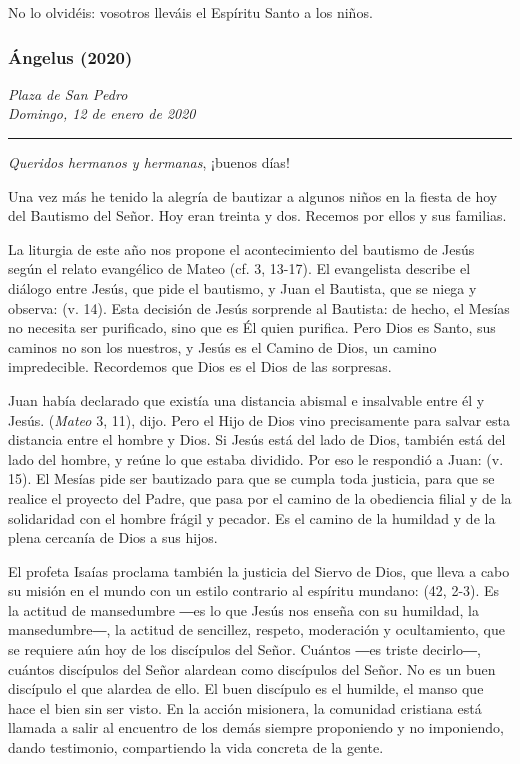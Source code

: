 {No lo olvidéis: vosotros lleváis el Espíritu Santo a los niños.



\subsubsection{Ángelus (2020)} \emph{Plaza de San Pedro\\ Domingo, 12 de enero de 2020}

\begin{center}\rule{0.5\linewidth}{\linethickness}\end{center}



\emph{Queridos hermanos y hermanas}, ¡buenos días!

Una vez más he tenido la alegría de bautizar a algunos niños en la fiesta de hoy del Bautismo del Señor. Hoy eran treinta y dos. Recemos por ellos y sus familias.

La liturgia de este año nos propone el acontecimiento del bautismo de Jesús según el relato evangélico de Mateo (cf. 3, 13-17). El evangelista describe el diálogo entre Jesús, que pide el bautismo, y Juan el Bautista, que se niega y observa:  (v. 14). Esta decisión de Jesús sorprende al Bautista: de hecho, el Mesías no necesita ser purificado, sino que es Él quien purifica. Pero Dios es Santo, sus caminos no son los nuestros, y Jesús es el Camino de Dios, un camino impredecible. Recordemos que Dios es el Dios de las sorpresas.

Juan había declarado que existía una distancia abismal e insalvable entre él y Jesús.  (\emph{Mateo} 3, 11), dijo. Pero el Hijo de Dios vino precisamente para salvar esta distancia entre el hombre y Dios. Si Jesús está del lado de Dios, también está del lado del hombre, y reúne lo que estaba dividido. Por eso le respondió a Juan:  (v. 15). El Mesías pide ser bautizado para que se cumpla toda justicia, para que se realice el proyecto del Padre, que pasa por el camino de la obediencia filial y de la solidaridad con el hombre frágil y pecador. Es el camino de la humildad y de la plena cercanía de Dios a sus hijos.

El profeta Isaías proclama también la justicia del Siervo de Dios, que lleva a cabo su misión en el mundo con un estilo contrario al espíritu mundano:  (42, 2-3). Es la actitud de mansedumbre ―es lo que Jesús nos enseña con su humildad, la mansedumbre―, la actitud de sencillez, respeto, moderación y ocultamiento, que se requiere aún hoy de los discípulos del Señor. Cuántos ―es triste decirlo―, cuántos discípulos del Señor alardean como discípulos del Señor. No es un buen discípulo el que alardea de ello. El buen discípulo es el humilde, el manso que hace el bien sin ser visto. En la acción misionera, la comunidad cristiana está llamada a salir al encuentro de los demás siempre proponiendo y no imponiendo, dando testimonio, compartiendo la vida concreta de la gente.

}
